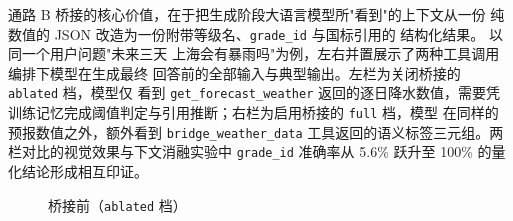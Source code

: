通路 B 桥接的核心价值，在于把生成阶段大语言模型所"看到"的上下文从一份
纯数值的 JSON 改造为一份附带等级名、\texttt{grade\_\bk{}id} 与国标引用的
结构化结果。 以同一个用户问题"未来三天
上海会有暴雨吗"为例，左右并置展示了两种工具调用编排下模型在生成最终
回答前的全部输入与典型输出。左栏为关闭桥接的 \texttt{ablated} 档，模型仅
看到 \texttt{get\_\bk{}forecast\_\bk{}weather} 返回的逐日降水数值，需要凭
训练记忆完成阈值判定与引用推断；右栏为启用桥接的 \texttt{full} 档，模型
在同样的预报数值之外，额外看到 \texttt{bridge\_\bk{}weather\_\bk{}data}
工具返回的语义标签三元组。两栏对比的视觉效果与下文消融实验中
\texttt{grade\_\bk{}id} 准确率从 5.6\% 跃升至 100\% 的量化结论形成相互印证。

\begin{figure}[!t]
    \centering
    \footnotesize
    \begin{minipage}[t]{0.48\linewidth}
        \centering
        {\hei 桥接前（\texttt{ablated} 档）}\\[0.2em]
\end{minipage}
\end{figure}
